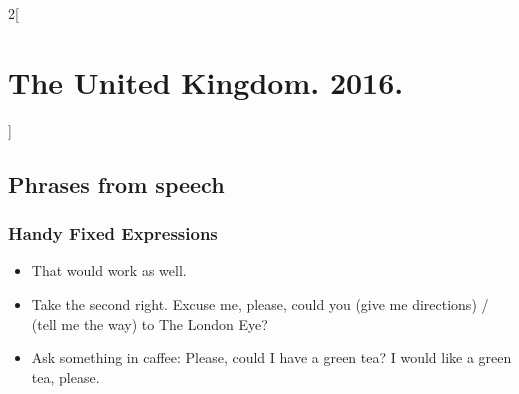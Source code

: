 \documentclass[10pt,a4paper]{article}
\newlength{\OriginalParIndent}
\newenvironment{ItemizeWithOrigParIndent}
    {\begin{itemize}[leftmargin=\OriginalParIndent]}
    {\end{itemize}}
\begin{document}

\newpage
\setcounter{secnumdepth}{3} %

\begin{multicols}{2}[\section{The United Kingdom. 2016.}]

\subsection{Phrases from speech}

\subsubsection{Handy Fixed Expressions}
\begin{ItemizeWithOrigParIndent}
   \item That would work as well.
   \item Take the second right. Excuse me, please, could you (give me directions) /
   (tell me the way) to The London Eye?
   \item Ask something in caffee: Please, could I have a green tea? I would like a green tea, please.
\end{ItemizeWithOrigParIndent}



\end{multicols}
\end{document}
